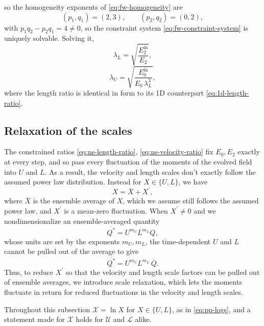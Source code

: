 \documentclass{article}
\begin{document}
so the homogeneity exponents of \eqref{eq:fw-homogeneity} are
\begin{equation}\label{eq:ns-exponents}
  (p_1, q_1) = (2, 3), \qquad (p_2, q_2) = (0, 2),
\end{equation}
with $p_1 q_2 - p_2 q_1 = 4 \neq 0$, so the constraint system
\eqref{eq:fw-constraint-system} is uniquely solvable. Solving it,
\begin{equation}\label{eq:ns-length-ratio}
  \lambda_L = \sqrt{\frac{E_2^{\mathrm{in}}}{E_2}},
\end{equation}
\begin{equation}\label{eq:ns-velocity-ratio}
  \lambda_U = \sqrt{\frac{E_0^{\mathrm{in}}}{E_0\, \lambda_L^{3}}} ,
\end{equation}
where the length ratio is identical in form to its 1D counterpart
\eqref{eq:1d-length-ratio}.

\subsection{Relaxation of the scales}\label{ssec:ns-scale-relaxation}
The constrained ratios \eqref{eq:ns-length-ratio}, \eqref{eq:ns-velocity-ratio}
fix $E_0, E_2$ exactly at every step, and so pass every fluctuation of the
moments of the evolved field into $U$ and $L$. As a result, the velocity and length
scales don't exactly follow the assumed power law distribution. Instead for $X\in \{U, L\}$, we have
\begin{equation}
  X = \overline{X} + X^\prime,
\end{equation}
where $\overline{X}$ is the ensemble average of $X$, which we assume still
follows the assumed power law, and $X^\prime$ is a mean-zero fluctuation. When
$X^\prime \ne 0$ and we nondimensionalize an ensemble-averaged quantity
\begin{equation}
  \overline{Q^*} = \overline{U^{m_U} L^{m_L} Q},
\end{equation}
whose units are set by the exponents $m_U, m_L$, the time-dependent $U$ and
$L$ cannot be pulled out of the average to give
\begin{equation}
  \overline{Q^*} = U^{m_U} L^{m_L}\, \overline{Q}.
\end{equation}
Thus, to reduce $X^\prime$ so that the velocity and length scale factors can
be pulled out of ensemble averages, we introduce scale relaxation, which lets
the moments fluctuate in return for reduced fluctuations in the velocity and
length scales.
\par
Throughout this subsection $\mathcal{X} = \ln X$ for $X \in \{U, L\}$, as in
\eqref{eq:pp-logs}, and a statement made for $\mathcal{X}$ holds for
$\mathcal{U}$ and $\mathcal{L}$ alike.
\end{document}
